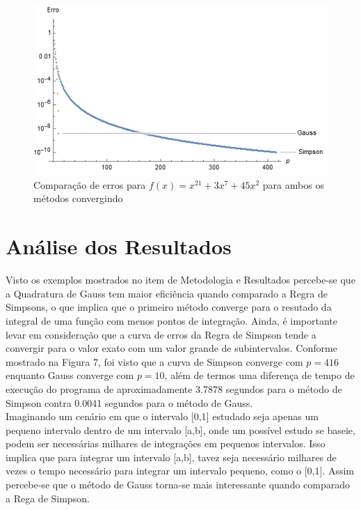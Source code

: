 \documentclass[12pt,a4paper]{article}
\begin{document}
\begin{figure}[h]
\includegraphics{images/erro_poli_convergindo}
\caption{Comparação de erros para $f(x)=x^{21}+3x^7+45x^2$ para ambos os métodos convergindo}
\end{figure}


\newpage
\section{Análise dos Resultados}
\qquad Visto os exemplos mostrados no item de Metodologia e Resultados percebe-se que a Quadratura de Gauss tem maior eficiência quando comparado a Regra de Simpsons, o que implica que o primeiro método converge para o resutado da integral de uma função com menos pontos de integração. Ainda, é importante levar em consideração que a curva de erros da Regra de Simpson tende a convergir para o valor exato com um valor grande de subintervalos. Conforme mostrado na Figura 7, foi visto que a curva de Simpson converge com $p=416$ enquanto Gauss converge com $p=10$, além de termos uma diferença de tempo de execução do programa de aproximadamente 3.7878 segundos para o método de Simpson contra 0.0041 segundos para o método de Gauss.\\

\qquad Imaginando um cenário em que o intervalo [0,1] estudado seja apenas um pequeno intervalo dentro de um intervalo [a,b], onde um possível estudo se baseie, podem ser necessárias milhares de integrações em pequenos intervalos. Isso implica que para integrar um intervalo [a,b], tavez seja necessário milhares de vezes o tempo necessário para integrar um intervalo pequeno, como o [0,1]. Assim percebe-se que o método de Gauss torna-se mais interessante quando comparado a Rega de Simpson.
\newpage
\end{document}

